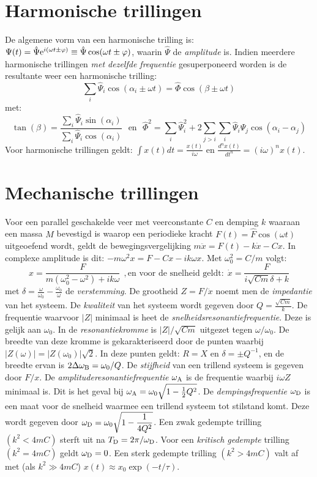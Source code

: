 \documentclass[twoside]{report}
\begin{document}
\section{Harmonische trillingen}
De algemene vorm van een harmonische trilling is:
$\Psi(t)=\hat{\Psi}{\rm e}^{i(\omega t\pm\varphi)}\equiv\hat{\Psi}\cos(\omega t\pm\varphi)$,
\npar
waarin $\hat{\Psi}$ de {\it amplitude} is. Indien meerdere harmonische
trillingen {\it met dezelfde frequentie} gesuperponeerd worden is de
resultante weer een harmonische trilling:
\[
\sum_i \hat{\Psi}_i\cos(\alpha_i\pm\omega t)=\hat{\Phi}\cos(\beta\pm\omega t)
\]
met:
\[
\tan(\beta)=\frac{\sum\limits_i\hat{\Psi}_i\sin(\alpha_i)}{\sum\limits_i\hat{\Psi}_i\cos(\alpha_i)}~~~\mbox{en}~~~
\hat{\Phi}^2=\sum_i\hat{\Psi}^2_i+2\sum_{j>i}\sum_i\hat{\Psi}_i\hat{\Psi}_j\cos(\alpha_i-\alpha_j)
\]
Voor harmonische trillingen geldt:
$\displaystyle\int x(t)dt=\frac{x(t)}{i\omega}$ en
$\displaystyle\frac{d^nx(t)}{dt^n}=(i\omega)^n x(t)$.

\section{Mechanische trillingen}
Voor een parallel geschakelde veer met veerconstante $C$ en demping $k$
waaraan een massa $M$ bevestigd is waarop een periodieke kracht
$F(t)=\hat{F}\cos(\omega t)$ uitgeoefend wordt, geldt de
bewegingsvergelijking $m\ddot{x}=F(t)-k\dot{x}-Cx$. In complexe amplitude is
dit: $-m\omega^2 x=F-Cx-ik\omega x$. Met $\omega_0^2=C/m$ volgt:
\[
x=\frac{F}{m(\omega_0^2-\omega^2)+ik\omega}~~,\mbox{en voor de snelheid geldt:}~~
\dot{x}=\frac{F}{i\sqrt{Cm}\delta+k}
\]
met $\displaystyle\delta=\frac{\omega}{\omega_0}-\frac{\omega_0}{\omega}$ de
{\it verstemming}. De grootheid $Z=F/\dot{x}$ noemt men de {\it impedantie}
van het systeem. De {\it kwaliteit} van het systeem wordt gegeven door
$\displaystyle Q=\frac{\sqrt{Cm}}{k}$.
\npar
De frequentie waarvoor $|Z|$ minimaal is heet de {\it snelheidsresonantiefrequentie}.
Deze is gelijk aan $\omega_0$. In de {\it resonantiekromme} is $|Z|/\sqrt{Cm}$
uitgezet tegen $\omega/\omega_0$. De breedte van deze kromme is gekarakteriseerd
door de punten waarbij $|Z(\omega)|=|Z(\omega_0)|\sqrt{2}$. In deze punten
geldt: $R=X$ en $\delta=\pm Q^{-1}$, en de breedte ervan is
$2\Delta\omega_{\rm B}=\omega_0/Q$.
\npar
De {\it stijfheid} van een trillend systeem is gegeven door $F/x$. De
{\it amplituderesonantiefrequentie} $\omega_{\rm A}$ is de frequentie waarbij
$i\omega Z$ minimaal is. Dit is het geval bij $\omega_{\rm A}=\omega_0\sqrt{1-\mbox{$\frac{1}{2}$} Q^2}$.
\npar
De {\it dempingsfrequentie} $\omega_{\rm D}$ is een maat voor de snelheid
waarmee een trillend systeem tot stilstand komt. Deze wordt gegeven door
$\displaystyle\omega_{\rm D}=\omega_0\sqrt{1-\frac{1}{4Q^2}}$. Een zwak
gedempte trilling $(k^2<4mC)$ sterft uit na $T_{\rm D}=2\pi/\omega_{\rm D}$.
Voor een {\it kritisch gedempte} trilling $(k^2=4mC)$ geldt $\omega_{\rm D}=0$.
Een sterk gedempte trilling $(k^2>4mC)$ valt af met (als $k^2\gg 4mC$)
$x(t)\approx x_0\exp(-t/\tau)$.
\end{document}
